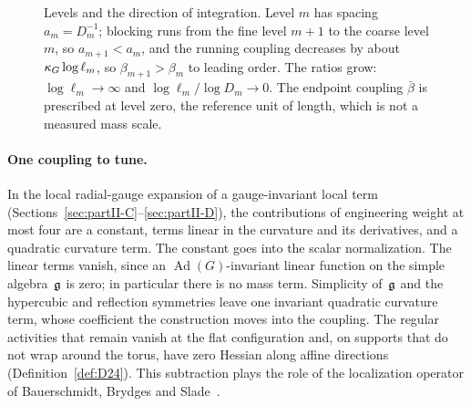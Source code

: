 \begin{figure}[ht]
\centering
{}
\caption{Levels and the direction of integration. Level $m$ has spacing $a_m=D_m^{-1}$; blocking runs from the fine level $m+1$ to the coarse level $m$, so $a_{m+1}<a_m$, and the running coupling decreases by about $\kappa_G\log\ell_m$, so $\beta_{m+1}>\beta_m$ to leading order. The ratios grow: $\log\ell_m\to\infty$ and $\log\ell_m/\log D_m\to0$. The endpoint coupling $\bar\beta$ is prescribed at level zero, the reference unit of length, which is not a measured mass scale.}\label{fig:scales}
\end{figure}

\paragraph{One coupling to tune.}
In the local radial-gauge expansion of a gauge-invariant local term (Sections~\ref{sec:partII-C}--\ref{sec:partII-D}), the contributions of engineering weight at most four are a constant, terms linear in the curvature and its derivatives, and a quadratic curvature term. The constant goes into the scalar normalization. The linear terms vanish, since an $\operatorname{Ad}(G)$-invariant linear function on the simple algebra~$\mathfrak{g}$ is zero; in particular there is no mass term. Simplicity of~$\mathfrak{g}$ and the hypercubic and reflection symmetries leave one invariant quadratic curvature term, whose coefficient the construction moves into the coupling. The regular activities that remain vanish at the flat configuration and, on supports that do not wrap around the torus, have zero Hessian along affine directions (Definition~\ref{def:D24}). This subtraction plays the role of the localization operator of Bauerschmidt, Brydges and Slade~\cite[\S5.2]{BauerschmidtBrydgesSlade2019}.

